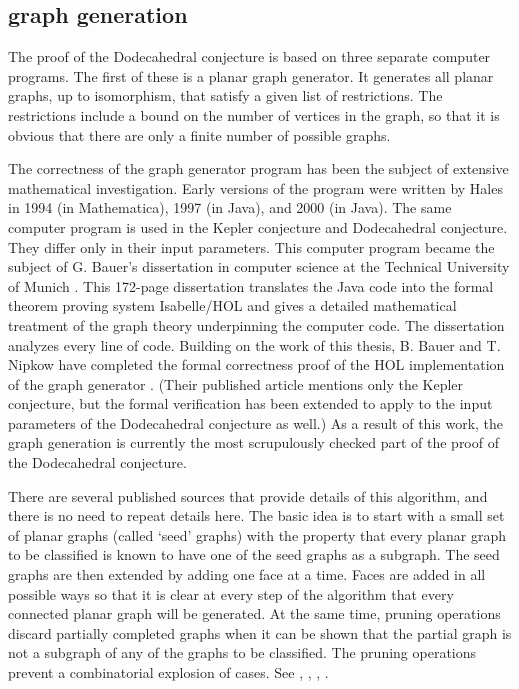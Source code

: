 

\subsection{graph generation}

The proof of the Dodecahedral conjecture is based on three separate
computer programs.  The first of these is a planar graph generator.
It generates all planar graphs, up to isomorphism, that satisfy
a given list of restrictions.  The restrictions include a bound on
the number of vertices in the graph, so that it is obvious that there are only a finite number of possible graphs.

The correctness of the graph generator program has been the 
subject of extensive
mathematical investigation.  Early versions of the program were
written by Hales in 1994 (in Mathematica), 1997 (in Java), and 2000 (in Java).  The same computer program is used in the Kepler conjecture
and Dodecahedral conjecture.  They differ only in their input parameters.
This computer program became the subject of  G. Bauer's
dissertation in computer science at the Technical University of Munich
\cite{Bauer}.
This 172-page dissertation translates the Java code into the
formal theorem proving system Isabelle/HOL and gives a detailed 
mathematical treatment of the graph theory underpinning the
computer code.  The dissertation analyzes every line of code.  
Building on the work of this thesis, B. Bauer
and T. Nipkow have completed the formal correctness proof of the HOL implementation
of the graph generator \cite{BN06}.  (Their published article mentions
only the Kepler conjecture, but the formal verification 
has been extended to
apply to the input parameters of the Dodecahedral conjecture as well.)
As a result of this work, the graph generation is currently the
most scrupulously checked part of the proof of the Dodecahedral
conjecture.

There are several published sources that provide details of this
algorithm, and there is no need to repeat details here.   The basic idea is to start
with a small set of planar graphs  (called `seed' graphs) with
the property that every planar graph to be classified is known to have
one of the seed graphs as a subgraph.  The seed graphs are then
extended by adding one face at a time.  Faces are added in all
possible ways so that it is clear at every step of the algorithm
that every connected planar graph will be generated.  At the same time,
pruning operations discard partially completed graphs when it can
be shown that the partial graph is not a subgraph of any of the
graphs to be classified.  The pruning operations prevent a
combinatorial explosion of cases.
See \cite[\S5]{alg}, \cite[\S19]{DCG}, \cite{Bauer}, \cite{BN06}.


